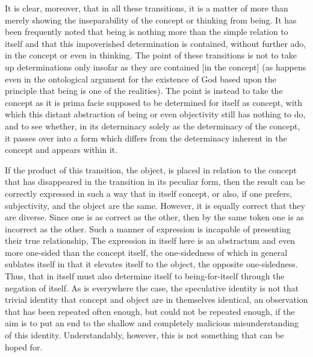 It is clear, moreover, that in all these transitions,
it is a matter of more than merely showing
the inseparability of the concept or thinking from being.
It has been frequently noted that being is
nothing more than the simple relation to itself
and that this impoverished determination is contained,
without further ado, in the concept or even in thinking.
The point of these transitions is not
to take up determinations only insofar as
they are contained [in the concept]
(as happens even in the ontological argument
for the existence of God based upon the principle
that being is one of the realities).
The point is instead to take the concept
as it is prima facie supposed to be
determined for itself as concept,
with which this distant abstraction of being
or even objectivity still has nothing to do,
and to see whether, in its determinacy solely
as the determinacy of the concept,
it passes over into a form which differs from
the determinacy inherent in the concept
and appears within it.

If the product of this transition, the object,
is placed in relation to the concept
that has disappeared in the transition in its peculiar form,
then the result can be correctly expressed in such a way
that in itself concept, or also, if one prefers, subjectivity,
and the object are the same.
However, it is equally correct that they are diverse.
Since one is as correct as the other,
then by the same token one is as incorrect as the other.
Such a manner of expression is incapable of presenting
their true relationship,
The expression in itself here is an abstractum
and even more one-sided than the concept itself,
the one-sidedness of which in general sublates itself
in that it elevates itself to the object,
the opposite one-sidedness.
Thus, that in itself must also determine itself to being-for-itself
through the negation of itself.
As is everywhere the case, the speculative identity is not
that trivial identity that concept and object
are in themselves identical,
an observation that has been repeated often enough,
but could not be repeated enough,
if the aim is to put an end to the shallow and completely malicious
misunderstanding of this identity.
Understandably, however, this is not something that can be hoped for.

